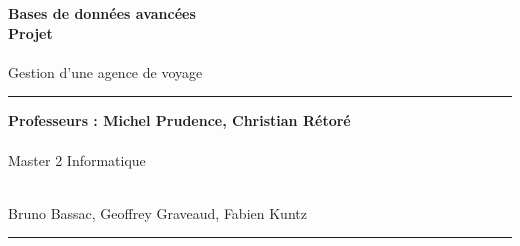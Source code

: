 \documentclass[a4paper]{article}
\newlength{\larg}
\begin{document}
\thispagestyle{empty}

\setlength{\unitlength}{1in}



\begin{flushright}
 \noindent {\rule{\larg}{0.5mm}}
\end{flushright}
\vspace{7mm}
\begin{flushright}
 \Huge{\bf Bases de donn\'ees avanc\'ees} \\
 \Huge{\bf Projet} \\
 ~\\
 \huge{Gestion d'une agence de voyage}\\
\end{flushright}
\vspace{7mm}
\begin{flushright}
 {\rule{\larg}{0.5mm}}
\end{flushright}
\vspace{2mm}
\begin{flushright}
 \large{\bf Professeurs : Michel Prudence, Christian R\'etor\'e} \\
 ~\\
 \large{Master 2 Informatique}\\
 ~\\
 \end{flushright}
 
 
%


\begin{flushright}
 \large{Bruno Bassac, Geoffrey Graveaud, Fabien Kuntz}
{\rule{\larg}{0.5mm}}
\end{flushright}

\newpage

\addtolength{\oddsidemargin}{1cm}

\thispagestyle{empty}
\tableofcontents
\newpage

\setcounter{page}{1}











\end{document}
